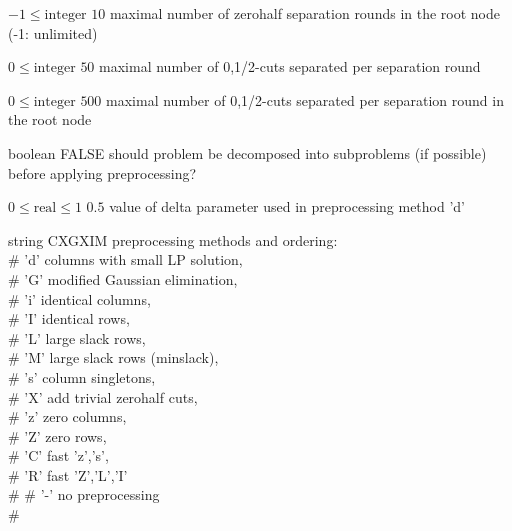 %
{$-1\leq\textrm{integer}$}%
{$10$}%
{maximal number of zerohalf separation rounds in the root node (-1: unlimited)}%
{}

%
{$0\leq\textrm{integer}$}%
{$50$}%
{maximal number of {0,1/2}-cuts separated per separation round}%
{}

%
{$0\leq\textrm{integer}$}%
{$500$}%
{maximal number of {0,1/2}-cuts separated per separation round in the root node}%
{}

%
{boolean}%
{FALSE}%
{should problem be decomposed into subproblems (if possible) before applying preprocessing?}%
{}

%
{$0\leq\textrm{real}\leq1$}%
{$0.5$}%
{value of delta parameter used in preprocessing method 'd'}%
{}

%
{string}%
{CXGXIM}%
{preprocessing methods and ordering:\\   \#                      'd' columns with small LP solution,\\   \#                      'G' modified Gaussian elimination,\\   \#                      'i' identical columns,\\   \#                      'I' identical rows,\\   \#                      'L' large slack rows,\\   \#                      'M' large slack rows (minslack),\\   \#                      's' column singletons,\\   \#                      'X' add trivial zerohalf cuts,\\   \#                      'z' zero columns,\\   \#                      'Z' zero rows,\\   \#                      'C' fast {'z','s'},\\   \#                      'R' fast {'Z','L','I'}\\   \#
   \#                      '-' no preprocessing\\   \#}%
{}

